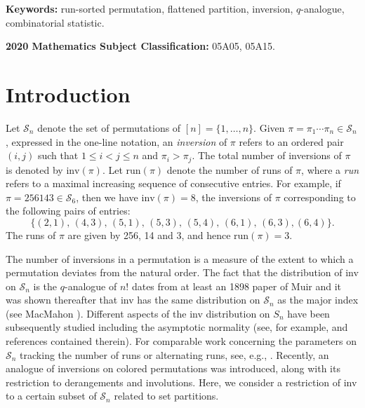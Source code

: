 \documentclass[11pt,a4paper]{article}
\begin{document}
{\bf Keywords:} run-sorted permutation, flattened partition, inversion, $q$-analogue, combinatorial statistic. \medskip

{\bf 2020 Mathematics Subject Classification:} 05A05, 05A15.

\section{Introduction}

Let $\mathcal{S}_n$ denote the set of permutations of $[n]=\{1,\ldots,n\}$.  Given $\pi=\pi_1\cdots \pi_n \in \mathcal{S}_n$, expressed in the one-line notation, an \emph{inversion} of $\pi$ refers to an ordered pair $(i,j)$ such that $1 \leq i < j \leq n$ and $\pi_i>\pi_j$.  The total number of inversions of $\pi$ is denoted by $\text{inv}(\pi)$.   Let $\text{run}(\pi)$ denote the number of runs of $\pi$, where a \emph{run} refers to a maximal increasing sequence of consecutive entries.  For example, if $\pi=256143 \in \mathcal{S}_6$, then we have $\text{inv}(\pi)=8$, the inversions of $\pi$ corresponding to the following pairs of entries:
$$\{(2,1),\,(4,3),\,(5,1),\,(5,3),\,(5,4),\,(6,1),\,(6,3),(6,4)\}.$$
The runs of $\pi$ are given by 256, 14 and 3, and hence $\text{run}(\pi)=3$.

The number of inversions in a permutation is a measure of the extent to which a permutation deviates from the natural order.  The fact that the distribution of inv on $\mathcal{S}_n$ is the $q$-analogue of $n!$ dates from at least an 1898 paper of Muir \cite{Muir} and it was shown thereafter that inv has the same distribution on $\mathcal{S}_n$ as the major index (see MacMahon \cite{Mac}).  Different aspects of the inv distribution on $S_n$ have been subsequently studied including the asymptotic normality (see, for example, \cite{Mar} and references contained therein).  For comparable work concerning the parameters on $\mathcal{S}_n$ tracking the number of runs or alternating runs, see, e.g., \cite{SMa1,SMa2,Zh}.  Recently, an analogue of inversions on colored permutations \cite{ARV} was introduced, along with its restriction to derangements and involutions.  Here, we consider a restriction of inv to a certain subset of $\mathcal{S}_n$ related to set partitions.
\end{document}
